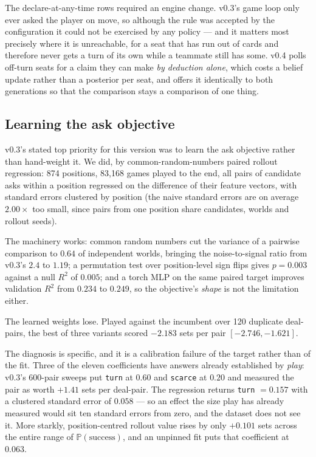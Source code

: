 \documentclass[11pt,a4paper]{article}
\newcommand{\Prob}{\ensuremath{\mathbb{P}}}
\begin{document}
The declare-at-any-time rows required an engine change. v0.3's game loop only
ever asked the player on move, so although the rule was accepted by the
configuration it could not be exercised by any policy --- and it matters most
precisely where it is unreachable, for a seat that has run out of cards and
therefore never gets a turn of its own while a teammate still has some. v0.4
polls off-turn seats for a claim they can make \emph{by deduction alone}, which
costs a belief update rather than a posterior per seat, and offers it identically
to both generations so that the comparison stays a comparison of one thing.

\subsection{Learning the ask objective}
\label{sec:res-learn}

v0.3's stated top priority for this version was to learn the ask objective
rather than hand-weight it. We did, by common-random-numbers paired rollout
regression: 874 positions, 83{,}168 games played to the end, all pairs of
candidate asks within a position regressed on the difference of their feature
vectors, with standard errors clustered by position (the naive standard errors
are on average $2.00\times$ too small, since pairs from one position share
candidates, worlds and rollout seeds).

The machinery works: common random numbers cut the variance of a pairwise
comparison to $0.64$ of independent worlds, bringing the noise-to-signal ratio
from v0.3's $2.4$ to $1.19$; a permutation test over position-level sign flips
gives $p = 0.003$ against a null $R^2$ of $0.005$; and a torch MLP on the same
paired target improves validation $R^2$ from $0.234$ to $0.249$, so the
objective's \emph{shape} is not the limitation either.

The learned weights lose. Played against the incumbent over 120 duplicate
deal-pairs, the best of three variants scored $-2.183$ sets per pair
$[-2.746, -1.621]$.

The diagnosis is specific, and it is a calibration failure of the target rather
than of the fit. Three of the eleven coefficients have answers already
established by \emph{play}: v0.3's 600-pair sweeps put \texttt{turn} at $0.60$
and \texttt{scarce} at $0.20$ and measured the pair as worth $+1.41$ sets per
deal-pair. The regression returns \texttt{turn} $= 0.157$ with a clustered
standard error of $0.058$ --- so an effect the size play has already measured
would sit ten standard errors from zero, and the dataset does not see it. More
starkly, position-centred rollout value rises by only $+0.101$ sets across the
entire range of $\Prob(\text{success})$, and an unpinned fit puts that
coefficient at $0.063$.
\end{document}
